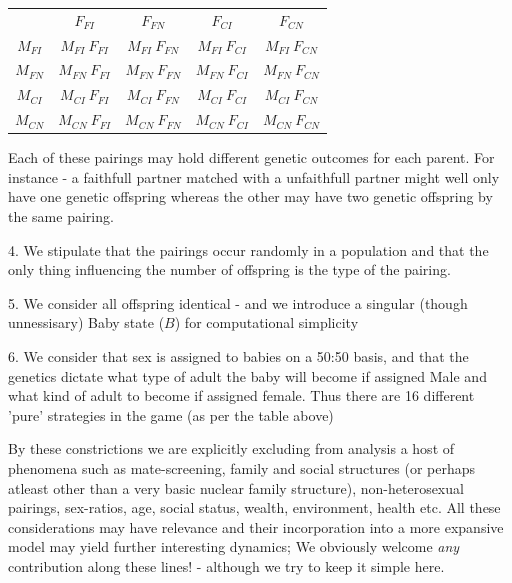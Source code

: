 \documentclass[journal,article,accept,oneauthors,pdftex,10pt,a4paper]{mdpi}
\begin{document}
\begin{table}[h]
    \centering
    \begin{tabular}{ccccc}
        & $F_{FI}$ & $F_{FN}$ & $F_{CI}$ & $F_{CN}$ \\
        \cline{2-5}
        \multicolumn{1}{c|}{$M_{FI}$} & \multicolumn{1}{c|}{$M_{FI}~F_{FI}$} & \multicolumn{1}{c|}{$M_{FI}~F_{FN}$} & \multicolumn{1}{c|}{$M_{FI}~F_{CI}$} & \multicolumn{1}{c|}{$M_{FI}~F_{CN}$} \\
        \cline{2-5}
        \multicolumn{1}{c|}{$M_{FN}$} & \multicolumn{1}{c|}{$M_{FN}~F_{FI}$} & \multicolumn{1}{c|}{$M_{FN}~F_{FN}$} & \multicolumn{1}{c|}{$M_{FN}~F_{CI}$} & \multicolumn{1}{c|}{$M_{FN}~F_{CN}$} \\
        \cline{2-5}
        \multicolumn{1}{c|}{$M_{CI}$} & \multicolumn{1}{c|}{$M_{CI}~F_{FI}$} & \multicolumn{1}{c|}{$M_{CI}~F_{FN}$} & \multicolumn{1}{c|}{$M_{CI}~F_{CI}$} & \multicolumn{1}{c|}{$M_{CI}~F_{CN}$} \\
        \cline{2-5}
        \multicolumn{1}{c|}{$M_{CN}$} & \multicolumn{1}{c|}{$M_{CN}~F_{FI}$} & \multicolumn{1}{c|}{$M_{CN}~F_{FN}$} & \multicolumn{1}{c|}{$M_{CN}~F_{CI}$} & \multicolumn{1}{c|}{$M_{CN}~F_{CN}$} \\
        \cline{2-5}
    \end{tabular}
\end{table}

Each of these pairings may hold different genetic outcomes for each parent. For instance - a faithfull partner matched with a unfaithfull partner might well only have one genetic offspring whereas the other may have two genetic offspring by the same pairing.

4. We stipulate that the pairings occur randomly in a population and that the only thing influencing the number of offspring is the type of the pairing. 

5. We consider all offspring identical - and we introduce a singular (though unnessisary) Baby state ($B$) for computational simplicity

6. We consider that sex is assigned to babies on a 50:50 basis, and that the genetics dictate what type of adult the baby will become if assigned Male and what kind of adult to become if assigned female. Thus there are 16 different 'pure' strategies in the game (as per the table above)

By these constrictions we are explicitly excluding from analysis a host of phenomena such as mate-screening, family and social structures (or perhaps atleast other than a very basic nuclear family structure), non-heterosexual pairings, sex-ratios, age, social status, wealth, environment, health etc. All these considerations may have relevance and their incorporation into a more expansive model may yield further interesting dynamics; We obviously welcome \textit{any} contribution along these lines! - although we try to keep it simple here.
\end{document}
